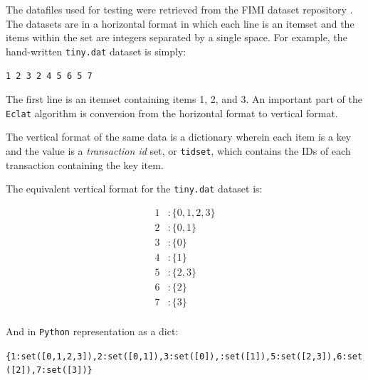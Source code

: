 \documentclass[11pt]{article}
\begin{document}
\begin{multicols}{2}
The datafiles used for testing were retrieved from the FIMI dataset
repository \cite{fimiDatasetRepo}.  The datasets are in a horizontal
format in which each line is an itemset and the items within the set
are integers separated by a single space.  For example, the
hand-written \texttt{tiny.dat} dataset is simply:

\texttt{1 2 3 2 4 5 6 5 7}

The first line is an itemset containing items 1, 2, and 3.  An
important part of the \texttt{Eclat} algorithm is conversion from the
horizontal format to vertical format.

The vertical format of the same data is a dictionary wherein each item
is a key and the value is a \emph{transaction id} set, or
\texttt{tidset}, which contains the IDs of each transaction containing
the key item.

The equivalent vertical format for the \texttt{tiny.dat} dataset is:

\begin{align*}
  1 &: \{ 0, 1, 2, 3 \} \\
  2 &: \{ 0, 1 \} \\
  3 &: \{ 0 \} \\
  4 &: \{ 1 \} \\
  5 &: \{ 2, 3 \} \\
  6 &: \{ 2 \} \\
  7 &: \{ 3 \} \\
\end{align*}

And in \texttt{Python} representation as a dict:

\texttt{\{1:set([0,1,2,3]),2:set([0,1]),3:set([0]),:set([1]),5:set([2,3]),6:set([2]),7:set([3])\}}




\end{multicols} %
\end{document}
